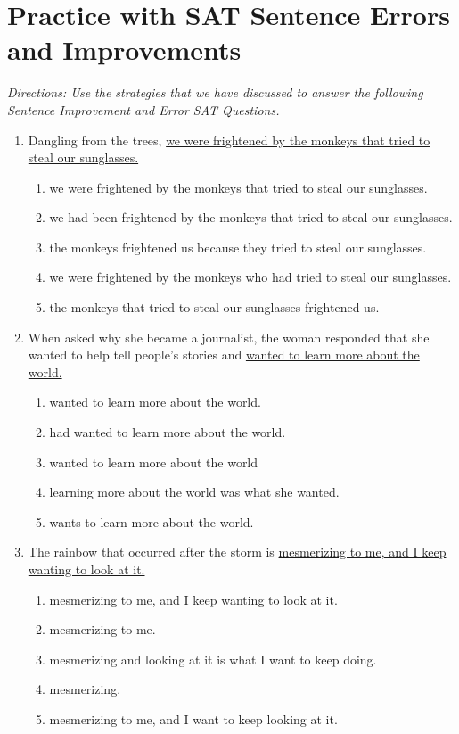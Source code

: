 \section{Practice with SAT Sentence Errors and Improvements}

\textit{Directions: Use the strategies that we have discussed to answer the following Sentence Improvement and Error SAT Questions.}

\begin{enumerate}
\item Dangling from the trees, \ul{we were frightened by the monkeys that tried to steal our sunglasses.}

\bigskip
\begin{enumerate}[label=(\Alph*)]
\item we were frightened by the monkeys that tried to steal our sunglasses.
\item we had been frightened by the monkeys that tried to steal our sunglasses.
\item the monkeys frightened us because they tried to steal our sunglasses.
\item we were frightened by the monkeys who had tried to steal our sunglasses.
\item the monkeys that tried to steal our sunglasses frightened us. 
\end{enumerate}


\item When asked why she became a journalist, the woman responded that she wanted to help tell people’s stories and \ul{wanted to learn more about the world.}

\bigskip
\begin{enumerate}[label=(\Alph*)]
\item wanted to learn more about the world.
\item had wanted to learn more about the world. 
\item wanted to learn more about the world
\item learning more about the world was what she wanted. 
\item wants to learn more about the world. 
\end{enumerate}

\item The rainbow that occurred after the storm is \ul{mesmerizing to me, and I keep wanting to look at it.}

\bigskip
\begin{enumerate}[label=(\Alph*)]
\item mesmerizing to me, and I keep wanting to look at it.
\item mesmerizing to me. 
\item mesmerizing and looking at it is what I want to keep doing. 
\item mesmerizing. 
\item mesmerizing to me, and I want to keep looking at it.
\end{enumerate}


\end{enumerate}
